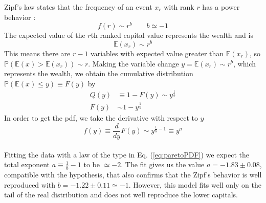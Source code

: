 Zipf's law states that the frequency of an event $x_r$ with rank $r$ has a power behavior \cite{zipf}:
\begin{equation}
    f(r) \sim r^b \ \ \ \ \ \ \ \ \ b \simeq -1
    \label{eq:zipf}
\end{equation}
The expected value of the $r$th ranked capital value represents the wealth and is
\begin{equation*}
    \mathbb{E}(x_r)\sim r^b
\end{equation*}
This means there are $r - 1$ variables with expected value greater than $\mathbb{E}(x_r)$, so $\mathbb{P}\left(\mathbb{E}(x) > \mathbb{E}(x_r)\right) \sim r$.
Making the variable change $y = \mathbb{E}(x_r) \sim r^b$, which represents the wealth, we obtain the cumulative distribution $\mathbb{P}\left(\mathbb{E}(x) \leq y\right) \equiv F(y)$ by
\begin{equation*}
    \begin{split}
        Q(y) &\equiv 1 - F(y) \sim y^{\frac{1}{b}} \\
        F(y) &\sim 1 - y^{\frac{1}{b}}
    \end{split}
\end{equation*}
In order to get the pdf, we take the derivative with respect to $y$
\begin{equation}
    f(y) \equiv \frac{d}{dy}F(y) \sim y^{\frac{1}{b} - 1} \equiv y^a
    \label{eq:paretoPDF}
\end{equation}
\\Fitting the data with a law of the type in Eq. (\ref{eq:paretoPDF}) we expect the total exponent $a \equiv \frac{1}{b} - 1$ to be $\simeq -2$.
The fit gives us the value $a = -1.83 \pm 0.08$, compatible with the hypothesis, that also confirms that the Zipf's behavior is well reproduced with $b = -1.22 \pm 0.11 \simeq -1$.
However, this model fits well only on the tail of the real distribution and does not well reproduce the lower capitals. \\ \\

